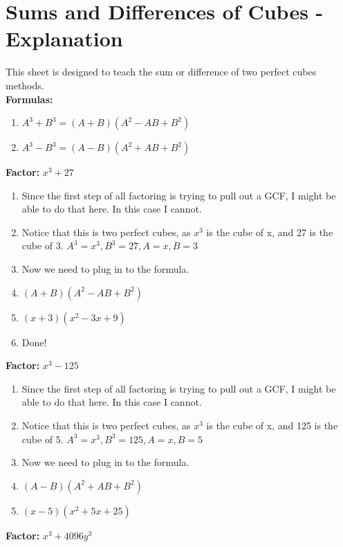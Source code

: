 \section{Sums and Differences of Cubes - Explanation}
This sheet is designed to teach the sum or difference of two perfect cubes methods. \\
\textbf{Formulas:} \\
\begin{enumerate}
\item [] $A^{3}+B^{3} = (A+B)(A^{2}-AB+B^{2})$
\item [] $A^{3}-B^{3} = (A-B)(A^{2}+AB+B^{2})$
\end{enumerate}
\textbf{Factor:} $x^{3} + 27$\\
\begin{enumerate}
\item Since the first step of all factoring is trying to pull out a GCF, I might be able to do that here. In this case I cannot.
\item Notice that this is two perfect cubes, as $x^{3}$ is the cube of x, and 27 is the cube of 3. $A^{3}=x^{3}, B^{3}=27, A=x, B=3$
\item Now we need to plug in to the formula.
\item [] $(A+B)(A^{2}-AB+B^{2})$
\item [] $(x+3)(x^{2}-3x+9)$
\item Done!
\end{enumerate}
\textbf{Factor:} $x^{3} - 125$\\
\begin{enumerate}
\item Since the first step of all factoring is trying to pull out a GCF, I might be able to do that here. In this case I cannot.
\item Notice that this is two perfect cubes, as $x^{3}$ is the cube of x, and 125 is the cube of 5. $A^{3}=x^{3}, B^{3}=125, A=x, B=5$
\item Now we need to plug in to the formula.
\item [] $(A-B)(A^{2}+AB+B^{2})$
\item [] $(x-5)(x^{2}+5x+25)$
\end{enumerate}
\textbf{Factor:} $x^{3} + 4096y^{3}$\\
